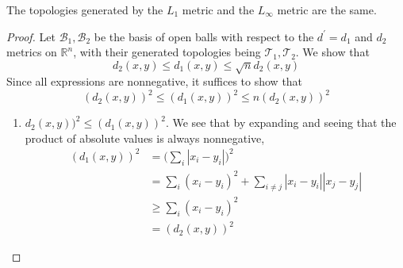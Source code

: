       \begin{theorem} 
        The topologies generated by the $L_1$ metric and the $L_\infty$ metric are the same. 
      \end{theorem} 
      \begin{proof}
        Let $\mathscr{B}_1, \mathscr{B}_2$ be the basis of open balls with respect to the $d^\prime = d_1$ and $d_2$ metrics on $\mathbb{R}^n$, with their generated topologies being $\mathscr{T}_1, \mathscr{T}_2$. We show that 
        \begin{equation}
          d_2 (x, y) \leq d_1 (x, y) \leq \sqrt{n} d_2 (x, y)
        \end{equation} 
        Since all expressions are nonnegative, it suffices to show that 
        \begin{equation}
          (d_2 (x, y))^2 \leq (d_1 (x, y))^2 \leq n (d_2 (x, y))^2
        \end{equation} 
        \begin{enumerate}
          \item $d_2 (x, y))^2 \leq (d_1 (x, y))^2$. We see that by expanding and seeing that the product of absolute values is always nonnegative, 
          \begin{align}
            (d_1 (x, y))^2 & = \bigg( \sum_i |x_i - y_i| \bigg)^2 \\
                           & = \sum_i (x_i - y_i)^2 + \sum_{i \neq j} |x_i - y_i| |x_j - y_j| \\ 
                           & \geq \sum_i (x_i - y_i)^2 \\
                           & = (d_2 (x, y))^2
          \end{align}


\end{enumerate}
\end{proof}
